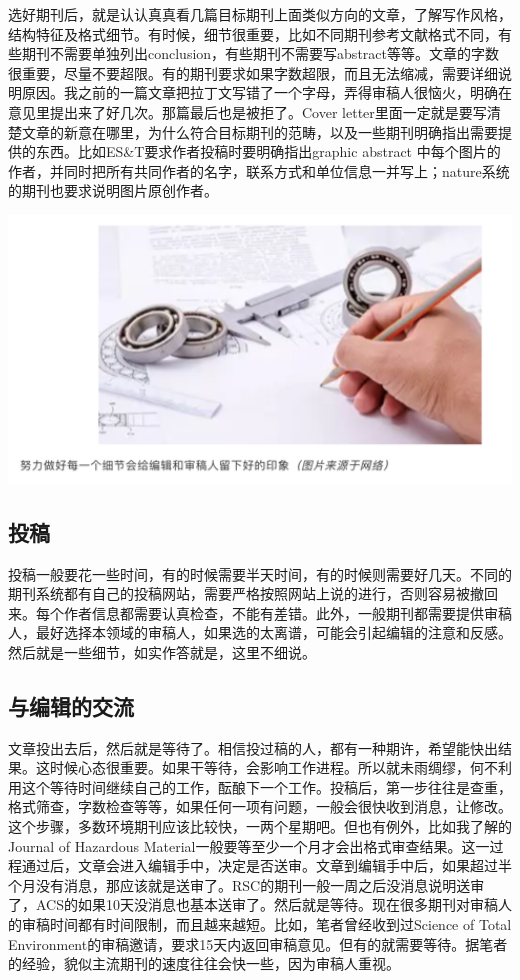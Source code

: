 \documentclass[]{book}
\begin{document}
选好期刊后，就是认认真真看几篇目标期刊上面类似方向的文章，了解写作风格，结构特征及格式细节。有时候，细节很重要，比如不同期刊参考文献格式不同，有些期刊不需要单独列出conclusion，有些期刊不需要写abstract等等。文章的字数很重要，尽量不要超限。有的期刊要求如果字数超限，而且无法缩减，需要详细说明原因。我之前的一篇文章把拉丁文写错了一个字母，弄得审稿人很恼火，明确在意见里提出来了好几次。那篇最后也是被拒了。Cover
letter里面一定就是要写清楚文章的新意在哪里，为什么符合目标期刊的范畴，以及一些期刊明确指出需要提供的东西。比如ES\&T要求作者投稿时要明确指出graphic
abstract
中每个图片的作者，并同时把所有共同作者的名字，联系方式和单位信息一并写上；nature系统的期刊也要求说明图片原创作者。

\includegraphics[width=6.67in]{images/tougao3}

\subsection{投稿}

投稿一般要花一些时间，有的时候需要半天时间，有的时候则需要好几天。不同的期刊系统都有自己的投稿网站，需要严格按照网站上说的进行，否则容易被撤回来。每个作者信息都需要认真检查，不能有差错。此外，一般期刊都需要提供审稿人，最好选择本领域的审稿人，如果选的太离谱，可能会引起编辑的注意和反感。然后就是一些细节，如实作答就是，这里不细说。

\subsection{与编辑的交流}

文章投出去后，然后就是等待了。相信投过稿的人，都有一种期许，希望能快出结果。这时候心态很重要。如果干等待，会影响工作进程。所以就未雨绸缪，何不利用这个等待时间继续自己的工作，酝酿下一个工作。投稿后，第一步往往是查重，格式筛查，字数检查等等，如果任何一项有问题，一般会很快收到消息，让修改。这个步骤，多数环境期刊应该比较快，一两个星期吧。但也有例外，比如我了解的Journal
of Hazardous
Material一般要等至少一个月才会出格式审查结果。这一过程通过后，文章会进入编辑手中，决定是否送审。文章到编辑手中后，如果超过半个月没有消息，那应该就是送审了。RSC的期刊一般一周之后没消息说明送审了，ACS的如果10天没消息也基本送审了。然后就是等待。现在很多期刊对审稿人的审稿时间都有时间限制，而且越来越短。比如，笔者曾经收到过Science
of Total
Environment的审稿邀请，要求15天内返回审稿意见。但有的就需要等待。据笔者的经验，貌似主流期刊的速度往往会快一些，因为审稿人重视。
\end{document}
